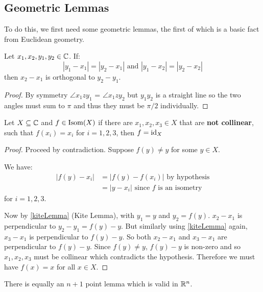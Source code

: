 \documentclass[../main.tex]{subfiles}
\begin{document}
\subsection{Geometric Lemmas}
To do this, we first need some geometric lemmas, the first of which is a basic fact from Euclidean geometry.
\begin{lemma}
  Let $x_1, x_2, y_1, y_2 \in \mathbb{C}$. If:
  \[
    |y_1 - x_1| = |y_2 - x_1| \text{ and } |y_1 - x_2| = |y_2 - x_2|
    \label{kiteLemma}
  \]
  then $x_2 - x_1$ is orthogonal to $y_2 - y_1$.
\end{lemma}
\begin{center}
\end{center}
\begin{proof}
  By symmetry $\angle x_1 z y_1$ = $\angle x_1 z y_2$ but $y_1 y_2$ is a straight line so the two angles must sum to $\pi$ and thus they must be $\pi/2$ individually.
\end{proof}
\begin{lemma}
  Let $X \subseteq \mathbb{C}$ and $f \in \operatorname{Isom}(X)$ if there are $x_1, x_2, x_3 \in X$ that are \textbf{not collinear}, such that $f(x_i) = x_i$ for $i = 1, 2, 3$, then $f = \mathrm{id}_X$
  \label{threePoint}
\end{lemma}
\begin{proof}
  Proceed by contradiction.
  Suppose $f(y) \neq y$ for some $y \in X$.

  We have:
  \begin{align*}
    |f(y) - x_i| &= |f(y) - f(x_i)| \text{ by hypothesis} \\
                 &= |y - x_i| \text{ since $f$ is an isometry}
  \end{align*}
  for $i =1, 2, 3$.

  Now by \cref{kiteLemma} (Kite Lemma), with $y_1 = y$ and $y_2 = f(y)$. $x_2 - x_1$ is perpendicular to $y_2 - y_1 = f(y) - y$.
  But similarly using \cref{kiteLemma} again, $x_3 - x_1$ is perpendicular to $f(y) - y$.
  So both $x_2 - x_1$ and $x_3 - x_1$ are perpendicular to $f(y) - y$.
  Since $f(y) \neq y$, $f(y) - y$ is non-zero and so $x_1, x_2, x_3$ must be collinear which contradicts the hypothesis.
  Therefore we must have $f(x) = x$ for all $x \in X$.
\end{proof}
\begin{remark}
  There is equally an $n + 1$ point lemma which is valid in $\mathbb{R}^{n}$.
\end{remark}
\end{document}
